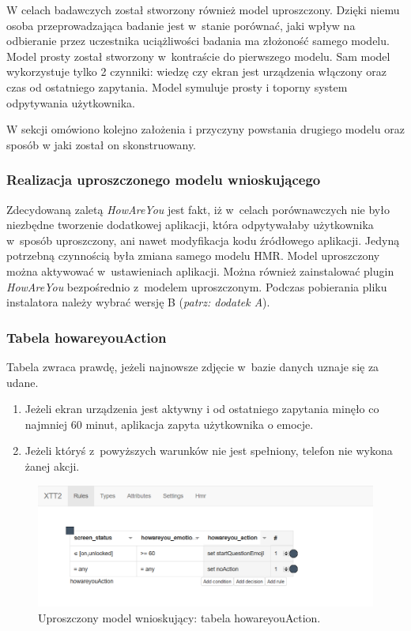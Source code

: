 W celach badawczych został stworzony również model uproszczony. Dzięki niemu osoba przeprowadzająca badanie jest w~stanie porównać, jaki wpływ na odbieranie przez uczestnika uciążliwości badania ma złożoność samego modelu. Model prosty został stworzony w~kontraście do pierwszego modelu. Sam model wykorzystuje tylko 2 czynniki: wiedzę czy ekran jest urządzenia włączony oraz czas od ostatniego zapytania. Model symuluje prosty i toporny system odpytywania użytkownika. 

W sekcji omówiono kolejno założenia i przyczyny powstania drugiego modelu oraz sposób w jaki został on skonstruowany.

\subsubsection{Realizacja uproszczonego modelu wnioskującego}

Zdecydowaną zaletą \textit{HowAreYou} jest fakt, iż w~celach porównawczych nie było niezbędne tworzenie dodatkowej aplikacji, która odpytywałaby użytkownika w~sposób uproszczony, ani nawet modyfikacja kodu źródłowego aplikacji. Jedyną potrzebną czynnością była zmiana samego modelu HMR. Model uproszczony można aktywować w~ustawieniach aplikacji. Można również zainstalować plugin \textit{HowAreYou} bezpośrednio z~modelem uproszczonym. Podczas pobierania pliku instalatora należy wybrać wersję B (\textit{patrz: dodatek A}).


\subsubsection{Tabela howareyouAction}

Tabela zwraca prawdę, jeżeli najnowsze zdjęcie w~bazie danych uznaje się za udane. 
\begin{enumerate}
	\item Jeżeli ekran urządzenia jest aktywny i od ostatniego zapytania minęło co najmniej 60 minut, aplikacja zapyta użytkownika o emocje.
	\item Jeżeli któryś z~powyższych warunków nie jest spełniony, telefon nie wykona żanej akcji.
\end{enumerate}

\begin{figure}[H]
	\centering
	\includegraphics[scale=0.8]{rozdzial4/HMR_basic.png}
	\caption{Uproszczony model wnioskujący: tabela howareyouAction.}
\end{figure}

